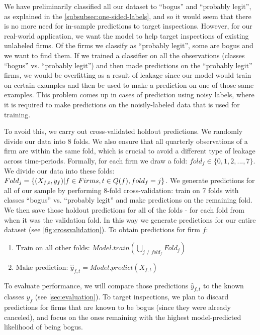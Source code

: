 We have preliminarily classified all our dataset to ``bogus'' and ``probably legit'', as explained in the \cref{subsubsec:one-sided-labels}, and so it would seem that there is no more need for in-sample predictions to target inspections. However, for our real-world application, we want the model to help target inspections of existing unlabeled firms. Of the firms we classify as ``probably legit'', some are bogus and we want to find them. If we trained a classifier on all the observations (classes ``bogus'' vs. ``probably legit'') and then made predictions on the ``probably legit'' firms, we would be overfitting as a result of leakage since our model would train on certain examples and then be used to make a prediction on one of those same examples. This problem comes up in cases of prediction using noisy labels, where it is required to make predictions on the noisily-labeled data that is used for training.

To avoid this, we carry out cross-validated holdout predictions. We randomly divide our data into 8 folds. We also ensure that all quarterly observations of a firm are within the same fold, which is crucial to avoid a different type of leakage across time-periods. Formally, for each firm we draw a fold: $fold_f \in \{0,1,2,...,7\}$. We divide our data into these folds: $Fold_j = \{(X_{f,t},y_f) \space | \space f \in Firms,\space t \in Q(f), \space fold_f=j\}$. We generate predictions for all of our sample by performing 8-fold cross-validation: train on 7 folds with classes ``bogus'' vs. ``probably legit'' and make predictions on the remaining fold. We then save those holdout predictions for all of the folds - for each fold from when it was the validation fold. In this way we generate predictions for our entire dataset (see \cref{fig:crossvalidation}). To obtain predictions for firm $f$:
\begin{enumerate}
\item $\text{Train on all other folds: } Model.train(\bigcup_{j\neq fold_f} Fold_j) $
\item $\text{Make prediction: }\hat{y}_{f,t} = Model.predict(X_{f,t}) $
\end{enumerate}

To evaluate performance, we will compare those predictions $\hat{y}_{f,t}$ to the known classes $y_f$ (see \cref{sec:evaluation}). To target inspections, we plan to discard predictions for firms that are known to be bogus (since they were already canceled), and focus on the ones remaining with the highest model-predicted likelihood of being bogus. 


